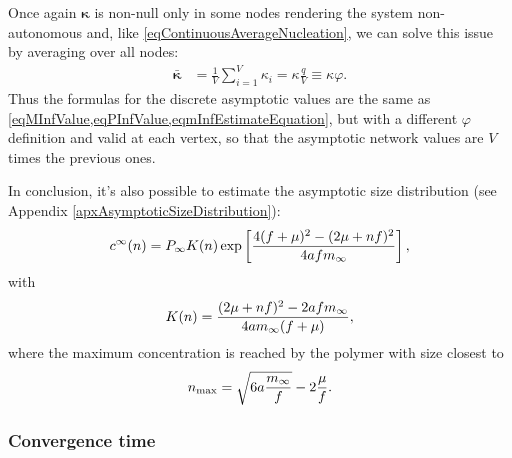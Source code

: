 \documentclass{article}
\begin{document}
                Once again $\boldsymbol\kappa$ is non-null only in some nodes rendering the system non-autonomous and, like \eqref{eqContinuousAverageNucleation}, we can solve this issue by averaging over all nodes:
                \begin{equation}
                    \begin{aligned}
                        \bar{\boldsymbol\kappa}&=
                        \frac1V\sum_{i=1}^V\kappa_i=
                        \kappa\frac qV\equiv\kappa\varphi.
                    \end{aligned}
                    \label{eqDiscreteAverageNucleation}
                \end{equation}
                Thus the formulas for the discrete asymptotic values are the same as \cref{eqMInfValue,eqPInfValue,eqmInfEstimateEquation}, but with a different $\varphi$ definition and valid at each vertex, so that the asymptotic network values are $V$ times the previous ones.

                In conclusion, it's also possible to estimate the asymptotic size distribution \cite[(87, 88) on p. 12]{Goriely2019} (see Appendix \ref{apxAsymptoticSizeDistribution}):
                \begin{equation}
                    c^\infty(n)=P_\infty K(n)
                    \exp\left[\frac{4(f+\mu)^2-(2\mu+nf)^2}{4afm_\infty}\right],
                    \label{eqAsymptoticSizeDistribution}
                \end{equation}
                with
                \begin{equation*}
                    K(n)=\frac{(2\mu+nf)^2-2afm_\infty}{4am_\infty(f+\mu)},
                \end{equation*}
                where the maximum concentration is reached by the polymer with size closest to
                \begin{equation}
                    n_{\max}=\sqrt{6a\frac{m_\infty} f}-2\frac\mu f.
                    \label{eqAsymptotic}
                \end{equation}

            \subsubsection{Convergence time}\label{secAsymptoticAnalysisNetwork}
\end{document}
